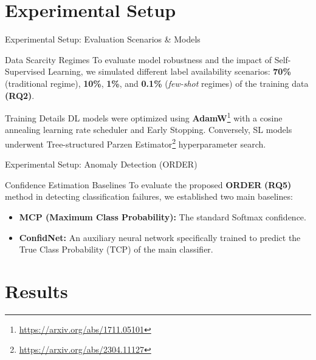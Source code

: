 \documentclass{beamer}
\begin{document}
\section{Experimental Setup}
\label{sec:06:setup}

\begin{frame}{Experimental Setup: Evaluation Scenarios \& Models}
    \begin{block}{Data Scarcity Regimes}
        To evaluate model robustness and the impact of Self-Supervised Learning, we simulated different label availability scenarios: \textbf{70\%} (traditional regime), \textbf{10\%}, \textbf{1\%}, and \textbf{0.1\%} (\textit{few-shot} regimes) of the training data \textbf{(RQ2)}.
    \end{block}
    
    \vspace{0.2cm}

    \begin{block}{Training Details}
        DL models were optimized using \textbf{AdamW}\footnote[1]{\url{https://arxiv.org/abs/1711.05101}} with a cosine annealing learning rate scheduler and Early Stopping. Conversely, SL models underwent Tree-structured Parzen Estimator\footnote[2]{\url{https://arxiv.org/abs/2304.11127}} hyperparameter search. 
    \end{block}
\end{frame}

\begin{frame}{Experimental Setup: Anomaly Detection (ORDER)}
    \begin{block}{Confidence Estimation Baselines}
        To evaluate the proposed \textbf{ORDER} \textbf{(RQ5)} method in detecting classification failures, we established two main baselines:
        \begin{itemize}
            \item \textbf{MCP (Maximum Class Probability):} The standard Softmax confidence.
            \item \textbf{ConfidNet:} An auxiliary neural network specifically trained to predict the True Class Probability (TCP) of the main classifier.
        \end{itemize}
    \end{block}

\end{frame}
    
\section{Results}
\end{document}
